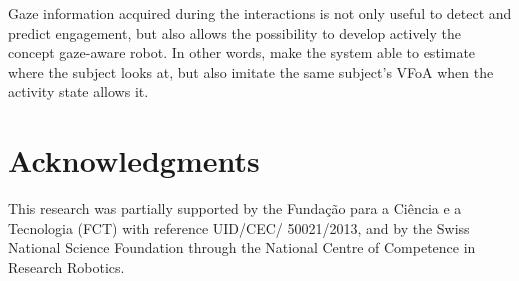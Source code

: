 \documentclass{sig-alternate}
\begin{document}
Gaze information acquired during the interactions is not only useful to detect
and predict engagement, but also allows the possibility to develop actively the
concept gaze-aware robot. In other words, make the system able to estimate where
the subject looks at, but also imitate the same subject's VFoA when the activity
state allows it. 

\section*{Acknowledgments}

This research was partially supported by the Funda\c{c}\~{a}o para a Ci\^{e}ncia
e a Tecnologia (FCT) with reference UID/CEC/ 50021/2013, and by the Swiss
National Science Foundation through the National Centre of Competence in
Research Robotics.



\end{document}

